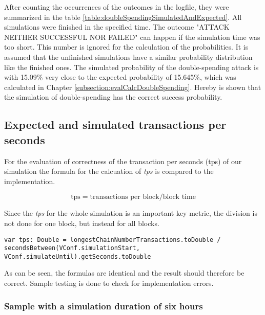 After counting the occurrences of the outcomes in the logfile, they were summarized in the table \ref{table:doubleSpendingSimulatedAndExpected}. All simulations were finished in the specified time. The outcome "ATTACK NEITHER SUCCESSFUL NOR FAILED" can happen if the simulation time was too short. This number is ignored for the calculation of the probabilities. It is assumed that the unfinished simulations have a similar probability distribution like the finished ones. The simulated probability of the double-spending attack is with 15.09\% very close to the expected probability of 15.645\%, which was calculated in Chapter \ref{subsection:evalCalcDoubleSpending}. Hereby is shown that the simulation of double-spending has the correct success probability.

\subsection{Expected and simulated transactions per seconds}

For the evaluation of correctness of the transaction per seconds (tps) of our simulation the formula for the calcuation of \textit{tps} is compared to the implementation.\linebreak


\begin{equation}
\text{tps} = \text{transactions per block} / \text{block time}
\end{equation}

Since the \textit{tps} for the whole simulation is an important key metric, the division is not done for one block, but instead for all blocks.\newline

\begin{minipage}{\linewidth}
\begin{lstlisting}[style=myScalastyle]
    var tps: Double = longestChainNumberTransactions.toDouble / secondsBetween(VConf.simulationStart, VConf.simulateUntil).getSeconds.toDouble
\end{lstlisting}
\end{minipage}

As can be seen, the formulas are identical and the result should therefore be correct. Sample testing is done to check for implementation errors.

\subsubsection{Sample with a simulation duration of six hours}

